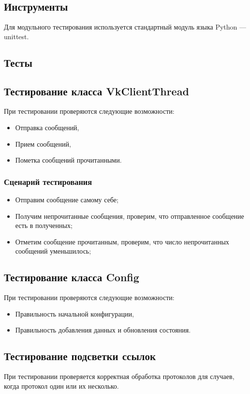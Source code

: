 \documentclass[12pt]{article}
\begin{document}
\subsection{Инструменты}

Для модульного тестирования используется стандартный модуль языка Python --- unittest.

\subsection{Тесты}
\subsection{Тестирование класса VkClientThread}
При тестировании проверяются следующие возможности:
\begin{itemize}
\setlength{\itemsep}{-1mm}
\item Отправка сообщений,
\item Прием сообщений,
\item Пометка сообщений прочитанными.
\end{itemize}

\subsubsection{Сценарий тестирования}
\begin{itemize}
\setlength{\itemsep}{-1mm}
\item Отправим сообщение самому себе;
\item Получим непрочитанные сообщения, проверим, что отправленное сообщение есть в полученных;
\item Отметим сообщение прочитанным, проверим, что число непрочитанных сообщений уменьшилось;
\end{itemize}

\subsection{Тестирование класса Config}
При тестировании проверяются следующие возможности:
\begin{itemize}
\setlength{\itemsep}{-1mm}
\item Правильность начальной конфигурации,
\item Правильность добавления данных и обновления состояния.
\end{itemize}

\subsection{Тестирование подсветки ссылок}
При тестировании проверяется корректная обработка протоколов для случаев, когда протокол один или их несколько.
\end{document}
